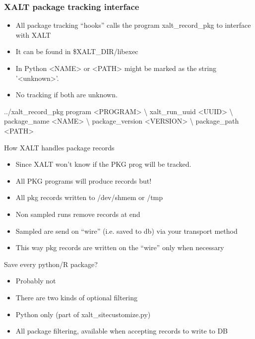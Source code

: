 \documentclass{beamer}
\begin{document}
\begin{frame}[fragile]
    \frametitle{XALT package tracking interface}
  \begin{itemize}
    \item All package tracking ``hooks'' calls the program
      xalt\_record\_pkg to interface with XALT
    \item It can be found in \$XALT\_DIR/libexec
    \item In Python <NAME> or <PATH> might be marked as the string
      '<unknown>'.
    \item No tracking if both are unknown.
  \end{itemize}
 {\small
    \begin{semiverbatim}
../xalt\_record\_pkg program          <PROGRAM> \textbackslash
                   xalt\_run\_uuid    <UUID>    \textbackslash
                   package\_name     <NAME>     \textbackslash
                   package\_version  <VERSION>  \textbackslash
                   package\_path     <PATH>
    \end{semiverbatim}
}
\end{frame}

\begin{frame}{How XALT handles package records}
  \begin{itemize}
    \item Since XALT won't know if the PKG prog will be tracked.
    \item All PKG programs will produce records but!
    \item All pkg records written to /dev/shmem or /tmp
    \item Non sampled runs remove records at end
    \item Sampled are send on ``wire'' (i.e. saved to db) via your
      transport method
    \item This way pkg records are written on the ``wire'' only when 
      necessary
  \end{itemize}
\end{frame}

\begin{frame}{Save every python/R package?}
  \begin{itemize}
    \item Probably not
    \item There are two kinds of optional filtering
    \item Python only (part of xalt\_sitecustomize.py)
    \item All package filtering, available when accepting records to
      write to DB
  \end{itemize}
\end{frame}
\end{document}
